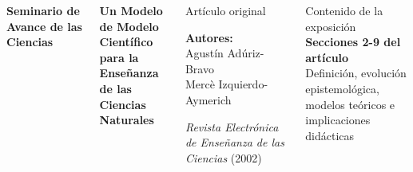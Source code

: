 
\begin{frame}[plain]
\vspace*{0.3cm}

\begin{columns}[T]


\begin{center}
{\large\textbf{\textcolor{VerdeUNAL}{Seminario de Avance de las Ciencias}}}
\end{center}

\vspace{0.3cm}

\begin{tcolorbox}[colback=VerdeUNAL!5,colframe=VerdeUNAL!80,boxrule=1pt,arc=2mm]
\begin{center}
{\LARGE\textbf{Un Modelo de Modelo Científico}} \\[0.2cm]
{\Large\textbf{para la Enseñanza de las}} \\[0.15cm]
{\Large\textbf{Ciencias Naturales}}
\end{center}
\end{tcolorbox}

\vspace{0.25cm}

\begin{block}{Artículo original}
\begin{center}
{\small \textbf{Autores:}\\[0.1cm]
Agustín Adúriz-Bravo\\
Mercè Izquierdo-Aymerich}

\vspace{0.2cm}

{\footnotesize \textit{Revista Electrónica de Enseñanza de las Ciencias} (2002)}
\end{center}
\end{block}

\vspace{0.2cm}

\begin{alertblock}{Contenido de la exposición}
\centering
{\small \textbf{Secciones 2-9 del artículo}}\\
{\footnotesize Definición, evolución epistemológica,\\modelos teóricos e implicaciones didácticas}
\end{alertblock}



\end{columns}
\end{frame}
